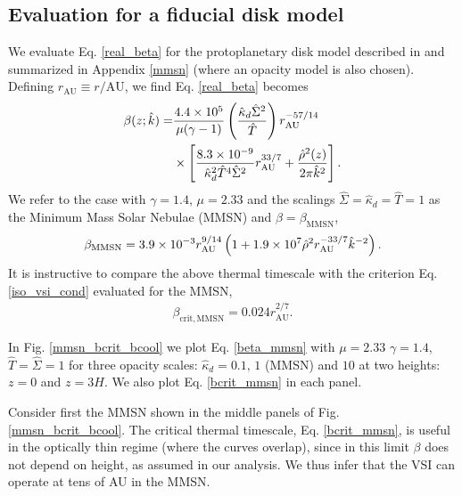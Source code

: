\subsection{Evaluation for a fiducial disk model}
We evaluate Eq. \ref{real_beta} for the protoplanetary disk model
described in \cite{chiang10} and summarized in Appendix \ref{mmsn}
(where an opacity model is also chosen). Defining $r_\mathrm{AU}\equiv 
r/\mathrm{AU}$, we find Eq. \ref{real_beta} becomes
\begin{align}\label{beta_mmsn}
  \beta(z; \hat{k}) =
  &\frac{4.4\times10^5}{\mu(\gamma-1)}\left(\frac{\hat{\kappa}_d\hat{\Sigma}^2}{\hat{T}}\right)r_\mathrm{AU}^{-57/14}\notag\\ 
&\times\left[\frac{8.3\times10^{-9}}{\hat{\kappa}_d^2\hat{T}^4\hat{\Sigma}^2}r_\mathrm{AU}^{33/7}+\frac{\hat{\rho}^2(z)}{2\pi\hat{k}^2}\right].         
\end{align} 
We refer to the case with $\gamma=1.4$, $\mu=2.33$ and the scalings
$\hat{\Sigma}=\hat{\kappa}_d=\hat{T}=1$ as the Minimum Mass Solar
Nebulae (MMSN) and $\beta=\beta_\mathrm{MMSN}$, 
\begin{align}\label{beta_mmsn_simp}
  \beta_\mathrm{MMSN} = 3.9\times10^{-3} r_\mathrm{AU}^{9/14}\left( 1 +
    1.9\times10^7\hat{\rho}^2r_\mathrm{AU}^{-33/7}\hat{k}^{-2}\right). 
\end{align}
It is instructive to compare the above thermal timescale 
with the criterion Eq. \ref{iso_vsi_cond} evaluated for the MMSN,     
\begin{align}\label{bcrit_mmsn}
  \beta_\mathrm{crit,MMSN} = 0.024r_\mathrm{AU}^{2/7}. 
\end{align}

In Fig. \ref{mmsn_bcrit_bcool} we plot Eq. \ref{beta_mmsn}  with $\mu
=2.33$ $\gamma=1.4$, $\hat{T}=\hat{\Sigma}=1$ for three
opacity scales: $\hat{\kappa}_d=0.1, \,1 $ (MMSN) and $10$ at two
heights: $z=0$ and $z=3H$. We also plot Eq. \ref{bcrit_mmsn} in each
panel.  

Consider first the MMSN shown in the middle panels of 
Fig. \ref{mmsn_bcrit_bcool}. The critical thermal timescale,
Eq. \ref{bcrit_mmsn}, is useful in the optically thin regime (where the
curves overlap), since in this limit $\beta$ does not depend on
height, as assumed in our analysis. We thus infer that the VSI can
operate at tens of AU in the MMSN.  

